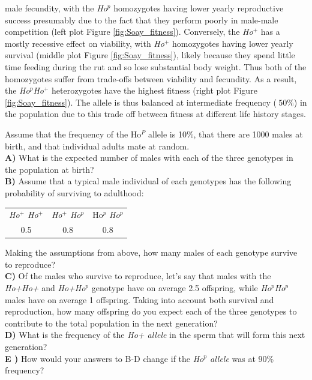 male fecundity, with the {\it Ho$^p$} homozygotes having lower yearly reproductive
success presumably due to the fact that they perform poorly in male-male
competition (left plot Figure \ref{fig:Soay_fitness}). Conversely, the
{\it Ho$^{+}$} has a mostly recessive effect on viability, with {\it Ho$^{+}$} homozygotes having lower
yearly survival  (middle plot Figure \ref{fig:Soay_fitness}), likely because they spend little time feeding during the rut and so lose substantial body weight. Thus both of the
homozygotes suffer from trade-offs between viability and
fecundity. As a result, the {\it Ho$^p$Ho$^+$} heterozygotes have the highest
fitness  (right plot Figure \ref{fig:Soay_fitness}).  The allele is
thus balanced at intermediate frequency ($~50\%$) in the population due to 
this trade off between fitness at different life history stages.

\begin{question}{}
Assume that the frequency of the Ho$^P$ allele is 10\%, that there are 1000 males at birth, and that individual adults mate at random.\\
{\bf A)} What is the expected number of males with each of the three genotypes in the population at birth? \\

{\bf B)} Assume that a typical male individual of each genotypes has the following probability of surviving to adulthood:\\
\begin{tabular}{ccc}
{\it Ho$^+$ Ho$^+$} & {\it  Ho$^+$ Ho$^p$} & Ho$^p$ {\it Ho$^p$} \\
0.5 & 0.8 & 0.8
\end{tabular}
Making the assumptions from above,  how many males of each genotype
survive to reproduce?\\
{\bf C)} Of the males who survive to reproduce, let's say that males
with the {\it Ho+Ho+}  and {\it  Ho+Ho$^p$}  genotype have on average 2.5 offspring, while {\it Ho$^p$Ho$^p$} males have on average 1 offspring. Taking into account both survival and reproduction, how many offspring do you expect each of the three genotypes to contribute to the total population in the next generation? \\

{\bf D)} What is the frequency of the {\it Ho+ allele} in the sperm that will form this next generation?  \\
{\bf E )} How would your answers to B-D change if the {\it Ho$^p$ allele} was at 90\% frequency? \\
\end{question}

